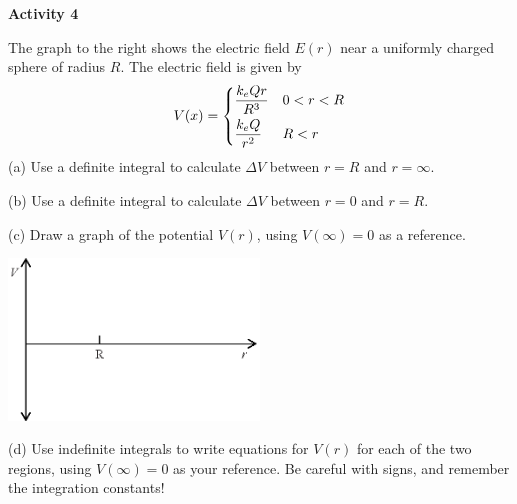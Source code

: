\textbf{Activity 4} 

The graph to the right shows the electric field $E(r)$ near a uniformly charged sphere of radius $R$.  The electric field is given by
\begin{displaymath}
V(x) = \begin{dcases}
        \frac{k_eQr}{R^3}  &  0<r<R\\
        \frac{k_eQ}{r^2}  &  R<r
        \end{dcases}
\end{displaymath}
(a) Use a definite integral to calculate $\Delta V$  between $r=R$ and $r=\infty$.
\vspace{1.1in}

(b) Use a definite integral to calculate $\Delta V$ between $r=0$ and $r=R$.
\vspace{1.1in}

(c) Draw a graph of the potential $V(r)$, using $V(\infty)=0$ as a reference.
\begin{center}
\includegraphics[width=0.5\textwidth]{finding_v_from_e/fig8.eps}
\end{center}

(d) Use indefinite integrals to write equations for $V(r)$ for each of the two regions, using $V(\infty)=0$ as your reference.  Be careful with signs, and remember the integration constants!
\vspace{1.3in}
